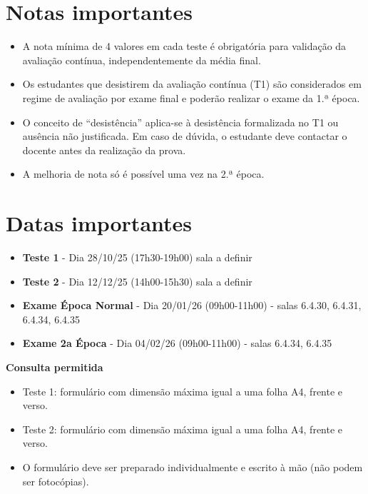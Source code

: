 \documentclass[
]{book}
\providecommand{\tightlist}{%
  \setlength{\itemsep}{0pt}\setlength{\parskip}{0pt}}
\begin{document}
\section{Notas importantes}\label{notas-importantes}

\begin{itemize}
\tightlist
\item
  A nota mínima de 4 valores em cada teste é obrigatória para validação da avaliação contínua, independentemente da média final.
\item
  Os estudantes que desistirem da avaliação contínua (T1) são considerados em regime de avaliação por exame final e poderão realizar o exame da 1.ª época.
\item
  O conceito de ``desistência'' aplica-se à desistência formalizada no T1 ou ausência não justificada. Em caso de dúvida, o estudante deve contactar o docente antes da realização da prova.
\item
  A melhoria de nota só é possível uma vez na 2.ª época.
\end{itemize}

\section{Datas importantes}\label{datas-importantes}

\begin{itemize}
\tightlist
\item
  \textbf{Teste 1} - Dia 28/10/25 (17h30-19h00) sala a definir
\item
  \textbf{Teste 2} - Dia 12/12/25 (14h00-15h30) sala a definir
\item
  \textbf{Exame Época Normal} - Dia 20/01/26 (09h00-11h00) - salas 6.4.30, 6.4.31, 6.4.34, 6.4.35
\item
  \textbf{Exame 2a Época} - Dia 04/02/26 (09h00-11h00) - salas 6.4.34, 6.4.35
\end{itemize}

\textbf{Consulta permitida}

\begin{itemize}
\item
  Teste 1: formulário com dimensão máxima igual a uma folha A4, frente
  e verso.
\item
  Teste 2: formulário com dimensão máxima igual a uma folha A4, frente
  e verso.
\item
  O formulário deve ser preparado individualmente e escrito à mão (não
  podem ser fotocópias).
\end{itemize}
\end{document}
